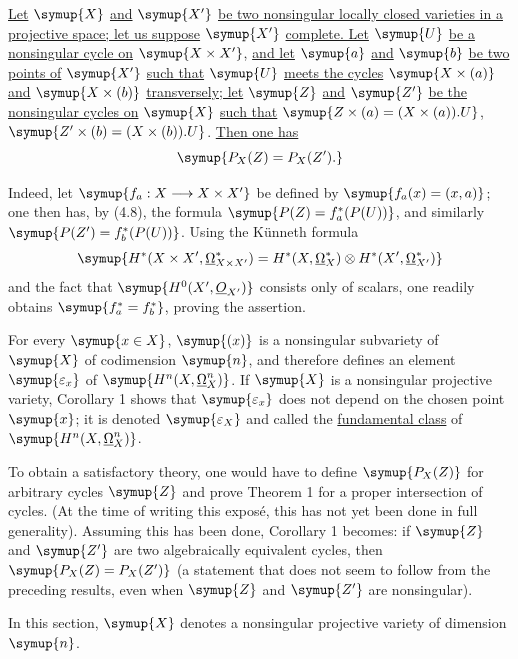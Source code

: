  \uline{Let} $\symup{X}$ \uline{and} $\symup{X'}$ \uline{be two nonsingular locally closed
varieties in a projective space; let us suppose} $\symup{X'}$ \uline{complete. Let} $\symup{U}$ \uline{be a nonsingular
cycle on} $\symup{X\times X'}$, \uline{and let} $\symup{a}$ \uline{and} $\symup{b}$ \uline{be two points of} $\symup{X'}$ \uline{such that} $\symup{U}$
\uline{meets the cycles} $\symup{X\times(a)}$ \uline{and} $\symup{X\times(b)}$ \uline{transversely; let} $\symup{Z}$ \uline{and} $\symup{Z'}$ \uline{be
the nonsingular cycles on} $\symup{X}$ \uline{such that}
$\symup{Z\times(a)=(X\times(a)).U}$, $\symup{Z'\times(b)=(X\times(b)).U}$.
\uline{Then one has}
\[
  \symup{P_X(Z)=P_X(Z').}
\]

Indeed, let $\symup{f_a:X\longrightarrow X\times X'}$ be defined by
$\symup{f_a(x)=(x,a)}$; one then has, by (4.8), the formula $\symup{P(Z)=f_a^{*}(P(U))}$, and similarly
$\symup{P(Z')=f_b^{*}(P(U))}$. Using the Künneth formula
\[
  \symup{H^{*}(X\times X',\underline{\Omega}_{X\times X'}^{*})
  =H^{*}(X,\underline{\Omega}_X^{*})\otimes H^{*}(X',\underline{\Omega}_{X'}^{*})}
\]
and the fact that $\symup{H^{0}(X',\Osh_{X'})}$ consists only of scalars, one readily
obtains $\symup{f_a^{*}=f_b^{*}}$, proving the assertion.

For every $\symup{x\in X}$, $\symup{(x)}$ is a nonsingular subvariety of $\symup{X}$ of
codimension $\symup{n}$, and therefore defines an element $\symup{\varepsilon_x}$ of
$\symup{H^{n}(X,\underline{\Omega}_X^{n})}$. If $\symup{X}$ is a nonsingular projective variety, Corollary 1
shows that $\symup{\varepsilon_x}$ does not depend on the chosen point $\symup{x}$; it is denoted
$\symup{\varepsilon_X}$ and called the \uline{fundamental class} of
$\symup{H^{n}(X,\underline{\Omega}_X^{n})}$.

 To obtain a satisfactory theory, one would have to define
$\symup{P_X(Z)}$ for arbitrary cycles $\symup{Z}$ and prove Theorem 1 for a proper intersection
of cycles. (At the time of writing this exposé, this has not yet been done in
full generality). Assuming this has been done, Corollary 1 becomes: if $\symup{Z}$ and
$\symup{Z'}$ are two algebraically equivalent cycles, then $\symup{P_X(Z)=P_X(Z')}$ (a statement
that does not seem to follow from the preceding results, even when $\symup{Z}$ and $\symup{Z'}$
are nonsingular).


In this section, $\symup{X}$ denotes a nonsingular projective variety of dimension $\symup{n}$.

